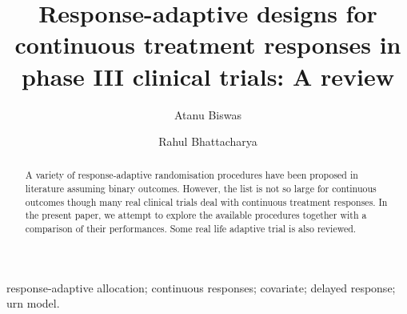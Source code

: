 

\begin{frontmatter}


\title{Response-adaptive designs for continuous treatment responses in phase III clinical trials: A review}



\newcommand{\artinfo}{\sffamily\fontsize{7pt}{8pt}\selectfont%
Statistical Methods in Medical Research\\
2015, Vol. 00(0) 00-00\\
\copyright\,The Author(s) 2014\\
Reprints and permission:\\ 
sagepub.co.uk/journalsPermissions.nav\\
DOI: 10.1177/0000000000000000\\
smm.sagepub.com\\
\texttt{[image: SAGE\_Logo.eps]}
}



\author{Atanu Biswas%
}
\author{Rahul Bhattacharya%
}




\begin{abstract}
A variety of response-adaptive randomisation procedures have been proposed in literature assuming binary outcomes. However, the list is not so large for continuous outcomes though many real clinical trials deal with
continuous treatment responses. In the present paper, we attempt to explore the available procedures together with a comparison of their performances. Some real life adaptive trial is also reviewed.
\end{abstract}

\begin{keyword}
response-adaptive allocation; continuous responses; covariate; delayed response; urn model.
\end{keyword}
\end{frontmatter}


